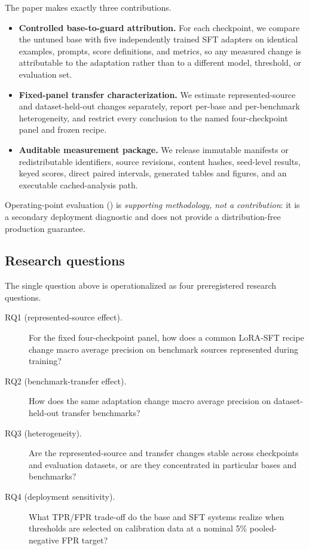 \documentclass[sigconf,nonacm]{acmart}
\begin{document}
The paper makes exactly three contributions.

\begin{itemize}
  \item \textbf{Controlled base-to-guard attribution.} For each checkpoint, we compare the untuned base with five independently trained SFT adapters on identical examples, prompts, score definitions, and metrics, so any measured change is attributable to the adaptation rather than to a different model, threshold, or evaluation set.
  \item \textbf{Fixed-panel transfer characterization.} We estimate represented-source and dataset-held-out changes separately, report per-base and per-benchmark heterogeneity, and restrict every conclusion to the named four-checkpoint panel and frozen recipe.
  \item \textbf{Auditable measurement package.} We release immutable manifests or redistributable identifiers, source revisions, content hashes, seed-level results, keyed scores, direct paired intervals, generated tables and figures, and an executable cached-analysis path.
\end{itemize}

Operating-point evaluation () is \emph{supporting methodology, not a contribution}: it is a secondary deployment diagnostic and does not provide a distribution-free production guarantee.

\subsection{Research questions}
\label{sec:rqs}

The single question above is operationalized as four preregistered research questions.

\begin{description}
  \item[RQ1 (represented-source effect).] For the fixed four-checkpoint panel, how does a common LoRA-SFT recipe change macro average precision on benchmark sources represented during training?
  \item[RQ2 (benchmark-transfer effect).] How does the same adaptation change macro average precision on dataset-held-out transfer benchmarks?
  \item[RQ3 (heterogeneity).] Are the represented-source and transfer changes stable across checkpoints and evaluation datasets, or are they concentrated in particular bases and benchmarks?
  \item[RQ4 (deployment sensitivity).] What TPR/FPR trade-off do the base and SFT systems realize when thresholds are selected on calibration data at a nominal 5\% pooled-negative FPR target?
\end{description}
\end{document}
